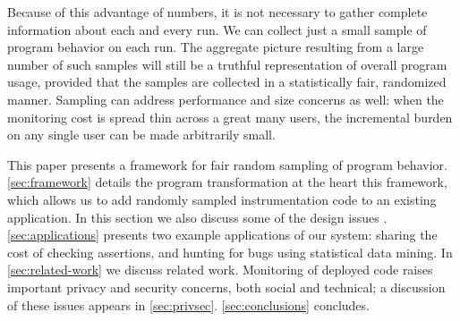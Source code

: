 Because of this advantage of numbers, it is not necessary to gather
complete information about each and every run.  We can collect just a
small sample of program behavior on each run.  The aggregate picture
resulting from a large number of such samples will still be a truthful
representation of overall program usage, provided that the samples are
collected in a statistically fair, randomized manner.  Sampling can
address performance and size concerns as well: when the monitoring
cost is spread thin across a great many users, the incremental burden
on any single user can be made arbitrarily small.

This paper presents a framework for fair random sampling of program
behavior.  \autoref{sec:framework} details the program transformation
at the heart this framework, which allows us to add randomly sampled
instrumentation code to an existing application.  In this section we
also discuss some of the design issues .
\autoref{sec:applications} presents two example applications of our
system: sharing the cost of checking assertions, and hunting for bugs
using statistical data mining.  In \autoref{sec:related-work} we
discuss related work.  Monitoring of deployed code raises important
privacy and security concerns, both social and technical; a discussion
of these issues appears in \autoref{sec:privsec}.
\autoref{sec:conclusions} concludes.



